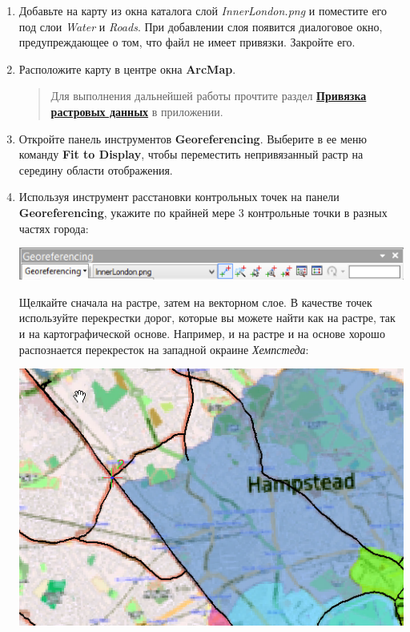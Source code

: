 \documentclass[12pt,]{book}
\begin{document}
\begin{enumerate}
\def\labelenumi{\arabic{enumi}.}
\item
  Добавьте на карту из окна каталога слой \emph{InnerLondon.png} и поместите его под слои \emph{Water} и \emph{Roads}. При добавлении слоя появится диалоговое окно, предупреждающее о том, что файл не имеет привязки. Закройте его.
\item
  Расположите карту в центре окна \textbf{ArcMap}.

  \begin{quote}
  Для выполнения дальнейшей работы прочтите раздел \textbf{\protect\hyperlink{manual-georef}{Привязка растровых данных}} в приложении.
  \end{quote}
\item
  Откройте панель инструментов \textbf{Georeferencing}. Выберите в ее меню команду \textbf{Fit to Display}, чтобы переместить непривязанный растр на середину области отображения.
\item
  Используя инструмент расстановки контрольных точек на панели \textbf{Georeferencing}, укажите по крайней мере 3 контрольные точки в разных частях города:

  \includegraphics{images/Ex07/image8.png}

  Щелкайте сначала на растре, затем на векторном слое. В качестве точек используйте перекрестки дорог, которые вы можете найти как на растре, так и на картографической основе. Например, и на растре и на основе хорошо распознается перекресток на западной окраине \emph{Хемпстеда}:

  \includegraphics{images/Ex07/image9.png}


\end{enumerate}
\end{document}
